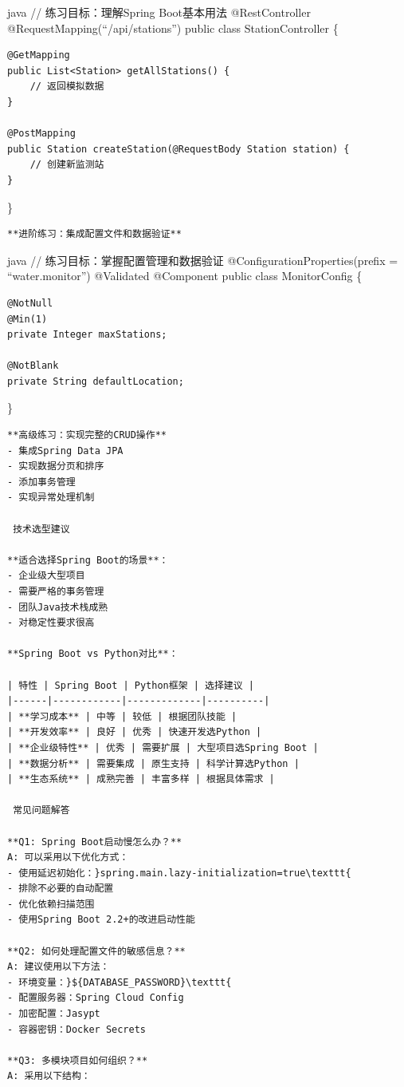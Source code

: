 java // 练习目标：理解Spring Boot基本用法 @RestController @RequestMapping(``/api/stations'') public class StationController \{

\begin{verbatim}
@GetMapping
public List<Station> getAllStations() {
    // 返回模拟数据
}

@PostMapping
public Station createStation(@RequestBody Station station) {
    // 创建新监测站
}
\end{verbatim}

\}

\begin{lstlisting}
**进阶练习：集成配置文件和数据验证**
\end{lstlisting}

java // 练习目标：掌握配置管理和数据验证 @ConfigurationProperties(prefix = ``water.monitor'') @Validated @Component public class MonitorConfig \{

\begin{verbatim}
@NotNull
@Min(1)
private Integer maxStations;

@NotBlank
private String defaultLocation;
\end{verbatim}

\}

\begin{lstlisting}
**高级练习：实现完整的CRUD操作**
- 集成Spring Data JPA
- 实现数据分页和排序
- 添加事务管理
- 实现异常处理机制

 技术选型建议

**适合选择Spring Boot的场景**：
- 企业级大型项目
- 需要严格的事务管理
- 团队Java技术栈成熟
- 对稳定性要求很高

**Spring Boot vs Python对比**：

| 特性 | Spring Boot | Python框架 | 选择建议 |
|------|------------|-------------|----------|
| **学习成本** | 中等 | 较低 | 根据团队技能 |
| **开发效率** | 良好 | 优秀 | 快速开发选Python |
| **企业级特性** | 优秀 | 需要扩展 | 大型项目选Spring Boot |
| **数据分析** | 需要集成 | 原生支持 | 科学计算选Python |
| **生态系统** | 成熟完善 | 丰富多样 | 根据具体需求 |

 常见问题解答

**Q1: Spring Boot启动慢怎么办？**
A: 可以采用以下优化方式：
- 使用延迟初始化：}spring.main.lazy-initialization=true\texttt{
- 排除不必要的自动配置
- 优化依赖扫描范围
- 使用Spring Boot 2.2+的改进启动性能

**Q2: 如何处理配置文件的敏感信息？**
A: 建议使用以下方法：
- 环境变量：}${DATABASE_PASSWORD}\texttt{
- 配置服务器：Spring Cloud Config
- 加密配置：Jasypt
- 容器密钥：Docker Secrets

**Q3: 多模块项目如何组织？**
A: 采用以下结构：
\end{lstlisting}

